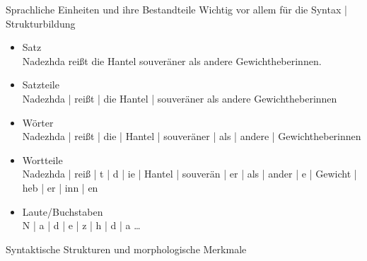 \begin{frame}
  {Sprachliche Einheiten und ihre Bestandteile}
  \onslide<+->
  \onslide<+->
  Wichtig vor allem für die Syntax | \alert{Strukturbildung}\\
  \Zeile
  \begin{itemize}[<+->]
    \item\footnotesize \alert{Satz} \\
      {Nadezhda reißt die Hantel souveräner als andere Gewichtheberinnen.}
      \Halbzeile

    \item\footnotesize \alert{Satzteile} \\
      {Nadezhda | reißt | die Hantel | souveräner als andere Gewichtheberinnen}
      \Halbzeile

    \item\footnotesize \alert{Wörter} \\
      {Nadezhda | reißt | die | Hantel | souveräner | als | andere | Gewichtheberinnen}
      \Halbzeile

    \item\footnotesize \alert{Wortteile} \\
      {Nadezhda | reiß | t | d | ie | Hantel | souverän | er | als | ander | e | Gewicht | heb | er | inn | en}
      \Halbzeile

    \item\footnotesize \alert{Laute\slash Buchstaben} \\
      {N | a | d | e | z | h | d | a \ldots}
  \end{itemize}
\end{frame}


\begin{frame}
  {Syntaktische Strukturen und morphologische Merkmale}
  \onslide<+->
  \onslide<+->
  \begin{center}
  \end{center}

  \Zeile
   
\end{frame}

